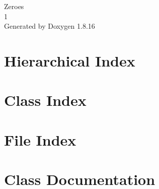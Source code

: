 \let\mypdfximage\pdfximage\def\pdfximage{\immediate\mypdfximage}\documentclass[twoside]{book}
\newcommand{\+}{\discretionary{\mbox{\scriptsize$\hookleftarrow$}}{}{}}
\newcommand{\clearemptydoublepage}{%
  \newpage{\pagestyle{empty}\cleardoublepage}%
}
\begin{document}
\hypersetup{pageanchor=false,
             bookmarksnumbered=true,
             pdfencoding=unicode
            }
\begin{titlepage}
\vspace*{7cm}
\begin{center}%
{\Large Zeroes \\[1ex]\large 1 }\\
\vspace*{1cm}
{\large Generated by Doxygen 1.8.16}\\
\end{center}
\end{titlepage}
\clearemptydoublepage
{}
\tableofcontents
\clearemptydoublepage
{}
\hypersetup{pageanchor=true}

\chapter{Hierarchical Index}

\chapter{Class Index}

\chapter{File Index}

\chapter{Class Documentation}


































\end{document}
